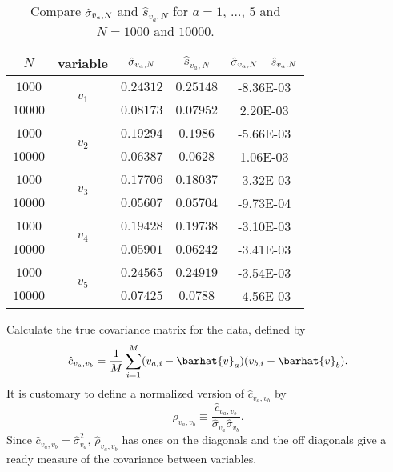 \begin{table}[H]
    \centering
    \caption{Compare \(\hat{\sigma}_{\bar{v}_a,N}\) and \(\hat{s}_{\bar{v}_a,N}\) for
    \(a = 1\), \(\ldots\), \(5\) and \(N = 1000\) and \(10000\).}
    \label{tab:s}
    \begin{tabular}{@{}ccccc@{}}
        \toprule
        \(N\)     & variable                 & \(\hat{\sigma}_{\bar{v}_a,N}\) & \(\hat{s}_{\bar{v}_a,N}\) & \(\hat{\sigma}_{\bar{v}_a,N}-\hat{s}_{\bar{v}_a,N}\) \\
        \midrule
        \(1000\)  & \multirow{2}{*}{\(v_1\)} & \(0.24312\)   & \(0.25148\)               & \num{-8.36E-03}                     \\
        \(10000\) &                          & \(0.08173\)   & \(0.07952\)               & \num{2.20E-03}                      \\
        \cmidrule{1-2}
        \(1000\)  & \multirow{2}{*}{\(v_2\)} & \(0.19294\)   & \(0.1986\)                & \num{-5.66E-03}                     \\
        \(10000\) &                          & \(0.06387\)   & \(0.0628\)                & \num{1.06E-03}                      \\
        \cmidrule{1-2}
        \(1000\)  & \multirow{2}{*}{\(v_3\)} & \(0.17706\)   & \(0.18037\)               & \num{-3.32E-03}                     \\
        \(10000\) &                          & \(0.05607\)   & \(0.05704\)               & \num{-9.73E-04}                     \\
        \cmidrule{1-2}
        \(1000\)  & \multirow{2}{*}{\(v_4\)} & \(0.19428\)   & \(0.19738\)               & \num{-3.10E-03}                     \\
        \(10000\) &                          & \(0.05901\)   & \(0.06242\)               & \num{-3.41E-03}                     \\
        \cmidrule{1-2}
        \(1000\)  & \multirow{2}{*}{\(v_5\)} & \(0.24565\)   & \(0.24919\)               & \num{-3.54E-03}                     \\
        \(10000\) &                          & \(0.07425\)   & \(0.0788\)                & \num{-4.56E-03}                     \\
        \bottomrule
    \end{tabular}
\end{table}


\Question{} Calculate the true covariance matrix for the data, defined by
%
\begin{equation}
    \hat{c}_{v_a, v_b} = \frac{ 1 }{ M }
    \sum_{i=1}^M (v_{a,i} - \barhat{v}_a) (v_{b,i} - \barhat{v}_b).
\end{equation}
%
It is customary to define a normalized version of \(\hat{c}_{v_a, v_b}\) by
%
\begin{equation}
    \hat{\rho}_{v_a, v_b} \equiv \frac{ \hat{c}_{v_a, v_b} }{ \hat{\sigma}_{v_a} \hat{\sigma}_{v_b} }.
\end{equation}
%
Since \(\hat{c}_{v_a, v_b} = \hat{\sigma}_{v_a}^2\),
\(\hat{\rho}_{v_a, v_b}\) has ones on the diagonals and the off diagonals give a
ready measure of the covariance between variables.

